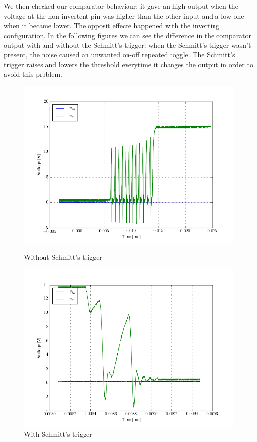 We then checked our comparator behaviour: it gave an high output when the voltage at the non invertent pin was higher than the other input and a low one when it became lower. The opposit effecte happened with the inverting configuration.
In the following figures we can see the difference in the comparator output with and without the Schmitt's trigger: when the Schmitt's trigger wasn't present, the noise caused an unwanted on-off repeated toggle. The Schmitt's trigger raises and lowers the threshold everytime it changes the output in order to avoid this problem.
\begin{figure}[H]
\begin{minipage}{.5\textwidth}
\centering
\includegraphics[width=\textwidth]{5/noise.png}
\caption{Without Schmitt's trigger}
\end{minipage}%
\begin{minipage}{.5\textwidth}
\centering
\includegraphics[width=\textwidth]{5/schmitt.png}
\caption{With Schmitt's trigger}
\end{minipage}
\end{figure}
